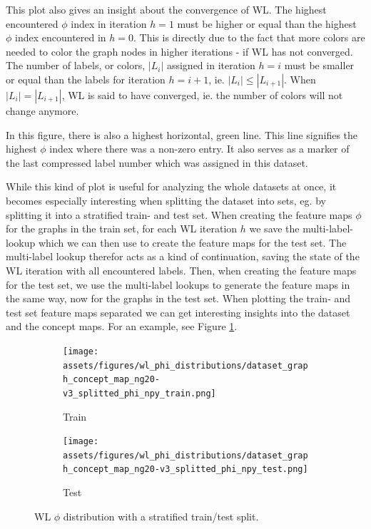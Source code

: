 This plot also gives an insight about the convergence of WL.
The highest encountered $\phi$ index in iteration $h=1$ must be higher or equal than the highest $\phi$ index encountered in $h=0$.
This is directly due to the fact that more colors are needed to color the graph nodes in higher iterations - if WL has not converged.
The number of labels, or colors, $|L_i|$ assigned in iteration $h=i$ must be smaller or equal than the labels for iteration $h=i+1$, ie. $|L_i| \leq |L_{i + 1}|$.
When $|L_i| = |L_{i + 1}|$, WL is said to have converged, ie. the number of colors will not change anymore.

In this figure, there is also a highest horizontal, green line.
This line signifies the highest $\phi$ index where there was a non-zero entry.
It also serves as a marker of the last compressed label number which was assigned in this dataset.

While this kind of plot is useful for analyzing the whole datasets at once, it becomes especially interesting when splitting the dataset into sets, eg. by splitting it into a stratified train- and test set.
When creating the feature maps $\phi$ for the graphs in the train set, for each WL iteration $h$ we save the multi-label-lookup which we can then use to create the feature maps for the test set.
The multi-label lookup therefor acts as a kind of continuation, saving the state of the WL iteration with all encountered labels.
Then, when creating the feature maps for the test set, we use the multi-label lookups to generate the feature maps in the same way, now for the graphs in the test set.
When plotting the train- and test set feature maps separated we can get interesting insights into the dataset and the concept maps.
For an example, see Figure \ref{fig:phi_distribution_train_test}.

\begin{figure}[htb!]
	\begin{subfigure}[t]{.49\linewidth}%
		{\texttt{[image: assets/figures/wl\_phi\_distributions/dataset\_graph\_concept\_map\_ng20-v3\_splitted\_phi\_npy\_train.png]}}\caption{Train}%
	\end{subfigure}%
	\begin{subfigure}[t]{.49\linewidth}%
		{\texttt{[image: assets/figures/wl\_phi\_distributions/dataset\_graph\_concept\_map\_ng20-v3\_splitted\_phi\_npy\_test.png]}}\caption{Test}%
	\end{subfigure}%
	\caption[Diagram: $\phi$ distribution plot for \textit{ng20}.]{WL $\phi$ distribution with a stratified train/test split.}%
	\label{fig:phi_distribution_train_test}
\end{figure}

